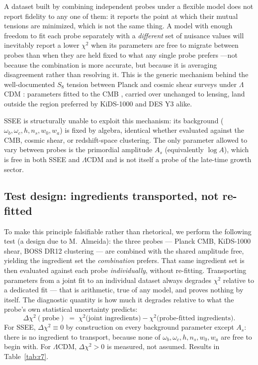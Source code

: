 \documentclass[12pt,a4paper]{article}
\newcommand{\SSEE}{\textsc{SSEE}}
\begin{document}
A dataset built by combining independent probes under a flexible model does
not report fidelity to any one of them: it reports the point at which their
mutual tensions are minimized, which is not the same thing. A model with
enough freedom to fit each probe separately with a \emph{different} set of
nuisance values will inevitably report a lower $\chi^2$ when its parameters are
free to migrate between probes than when they are held fixed to what any
single probe prefers ---not because the combination is more accurate, but
because it is averaging disagreement rather than resolving it. This is the
generic mechanism behind the well-documented $S_8$ tension between Planck and
cosmic shear surveys under $\Lambda$CDM \citep{DiValentino2021}: parameters
fitted to the CMB \citep{Planck2020}, carried over unchanged to lensing, land
outside the region preferred by KiDS-1000 \citep{Asgari2021,Heymans2021} and
DES Y3 \citep{Amon2022} alike.

\SSEE{} is structurally unable to exploit this mechanism: its background
(\(\omega_b,\omega_c,h,n_s,w_0,w_a\)) is fixed by algebra, identical whether
evaluated against the CMB, cosmic shear, or redshift-space clustering. The
only parameter allowed to vary between probes is the primordial amplitude
$A_s$ (equivalently $\log A$), which is free in both \SSEE{} and $\Lambda$CDM
and is not itself a probe of the late-time growth sector.

\subsection{Test design: ingredients transported, not re-fitted}
\label{sec:r7}

To make this principle falsifiable rather than rhetorical, we perform the
following test (a design due to M.~Almeida): the three probes --- Planck
CMB, KiDS-1000 shear, BOSS DR12 clustering --- are combined with the shared
amplitude free, yielding the ingredient set the \emph{combination} prefers.
That same ingredient set is then evaluated against each probe
\emph{individually}, without re-fitting. Transporting parameters from a joint
fit to an individual dataset always degrades $\chi^2$ relative to a dedicated
fit --- that is arithmetic, true of any model, and proves nothing by itself.
The diagnostic quantity is how much it degrades relative to what the
probe's own statistical uncertainty predicts:
\begin{equation}
  \Delta\chi^2(\text{probe}) \;=\;
  \chi^2\big(\text{joint ingredients}\big) - \chi^2\big(\text{probe-fitted ingredients}\big).
\end{equation}
For \SSEE{}, $\Delta\chi^2\equiv0$ by construction on every background
parameter except $A_s$: there is no ingredient to transport, because none of
$\omega_b,\omega_c,h,n_s,w_0,w_a$ are free to begin with. For $\Lambda$CDM,
$\Delta\chi^2>0$ is measured, not assumed. Results in
Table~\ref{tab:r7}.
\end{document}
